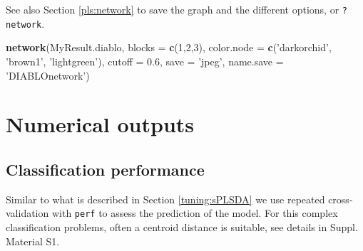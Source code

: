 \documentclass[]{book}
\newenvironment{Shaded}{\begin{snugshade}}{\end{snugshade}}
\newcommand{\KeywordTok}[1]{\textcolor[rgb]{0.13,0.29,0.53}{\textbf{#1}}}
\newcommand{\DataTypeTok}[1]{\textcolor[rgb]{0.13,0.29,0.53}{#1}}
\newcommand{\DecValTok}[1]{\textcolor[rgb]{0.00,0.00,0.81}{#1}}
\newcommand{\FloatTok}[1]{\textcolor[rgb]{0.00,0.00,0.81}{#1}}
\newcommand{\StringTok}[1]{\textcolor[rgb]{0.31,0.60,0.02}{#1}}
\newcommand{\CommentTok}[1]{\textcolor[rgb]{0.56,0.35,0.01}{\textit{#1}}}
\newcommand{\NormalTok}[1]{#1}
\theoremstyle{definition}
\theoremstyle{definition}
\theoremstyle{definition}
\theoremstyle{remark}
\begin{document}
See also Section \ref{pls:network} to save the graph and the different
options, or \texttt{?network}.

\begin{Shaded}
\begin{Highlighting}[]
\KeywordTok{network}\NormalTok{(MyResult.diablo, }\DataTypeTok{blocks =} \KeywordTok{c}\NormalTok{(}\DecValTok{1}\NormalTok{,}\DecValTok{2}\NormalTok{,}\DecValTok{3}\NormalTok{),}
        \DataTypeTok{color.node =} \KeywordTok{c}\NormalTok{(}\StringTok{'darkorchid'}\NormalTok{, }\StringTok{'brown1'}\NormalTok{, }\StringTok{'lightgreen'}\NormalTok{), }
        \DataTypeTok{cutoff =} \FloatTok{0.6}\NormalTok{, }\DataTypeTok{save =} \StringTok{'jpeg'}\NormalTok{, }\DataTypeTok{name.save =} \StringTok{'DIABLOnetwork'}\NormalTok{)}
\end{Highlighting}
\end{Shaded}

\section{Numerical outputs}\label{numerical-outputs}

\subsection{Classification
performance}\label{classification-performance}

Similar to what is described in Section \ref{tuning:sPLSDA} we use
repeated cross-validation with \texttt{perf} to assess the prediction of
the model. For this complex classification problems, often a centroid
distance is suitable, see details in \citep{mixomics} Suppl. Material
S1.

\begin{Shaded}
\end{Shaded}
\end{document}
